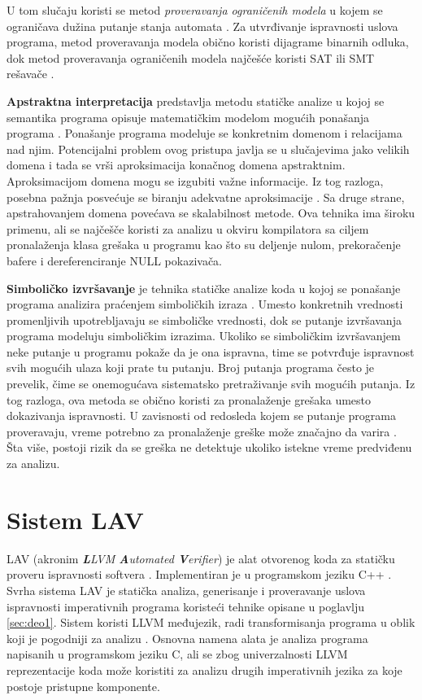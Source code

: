 \documentclass[12pt,oneside]{memoir}
\begin{document}
U tom slučaju koristi se metod \textit{proveravanja ograničenih modela} u kojem se ograničava dužina putanje stanja automata \cite{Verification}. Za utvrđivanje ispravnosti uslova programa, metod proveravanja modela obično koristi dijagrame binarnih odluka, dok metod proveravanja ograničenih modela najčešće koristi SAT ili SMT rešavače \cite{ModelCheck}.
\par
\textbf{Apstraktna interpretacija} predstavlja metodu statičke analize u kojoj se semantika programa opisuje matematičkim modelom mogućih ponašanja programa \cite{AbstractInterpretation}. Ponašanje programa modeluje se konkretnim domenom i relacijama nad njim. Potencijalni problem ovog pristupa javlja se u slučajevima jako velikih domena i tada se vrši aproksimacija konačnog domena apstraktnim. Aproksimacijom domena mogu se izgubiti važne informacije. Iz tog razloga, posebna pažnja posvećuje se biranju adekvatne aproksimacije \cite{AbstractInterpretation2}. Sa druge strane, apstrahovanjem domena povećava se skalabilnost metode. Ova tehnika ima široku primenu, ali se najčešče koristi za analizu u okviru kompilatora sa ciljem pronalaženja klasa grešaka u programu kao što su deljenje nulom, prekoračenje bafere i dereferenciranje NULL pokazivača.
\par
\textbf{Simboličko izvršavanje} je tehnika statičke analize koda u kojoj se ponašanje programa analizira praćenjem simboličkih izraza \cite{SymbolicExecution}. Umesto konkretnih vrednosti promenljivih upotrebljavaju se simboličke vrednosti, dok se putanje izvršavanja programa modeluju simboličkim izrazima. Ukoliko se simboličkim izvršavanjem neke putanje u programu pokaže da je ona ispravna, time se potvrđuje ispravnost svih mogućih ulaza koji prate tu putanju. Broj putanja programa često je prevelik, čime se onemogućava sistematsko pretraživanje svih mogućih putanja. Iz tog razloga, ova metoda se obično koristi za pronalaženje grešaka umesto dokazivanja ispravnosti. U zavisnosti od redosleda kojem se putanje programa proveravaju, vreme potrebno za pronalaženje greške može značajno da varira \cite{vstteLAV12}. Šta više, postoji rizik da se greška ne detektuje ukoliko istekne vreme predviđenu za analizu.
\section{Sistem LAV}  \label{sec:deo2}
LAV (akronim \textit{\textbf{L}LVM \textbf{A}utomated \textbf{V}erifier}) je alat otvorenog koda za statičku proveru ispravnosti softvera \cite{LAVTool}. Implementiran je u programskom jeziku C++ \cite{LAVCode}. Svrha sistema LAV je statička analiza, generisanje i proveravanje uslova ispravnosti imperativnih programa koristeći tehnike opisane u poglavlju \ref{sec:deo1}. Sistem koristi LLVM međujezik, radi transformisanja programa u oblik koji je pogodniji za analizu \cite{LLVMTool}. Osnovna namena alata je analiza programa napisanih u programskom jeziku C, ali se zbog univerzalnosti LLVM reprezentacije koda može koristiti za analizu drugih imperativnih jezika za koje postoje pristupne komponente. \par
\end{document}
